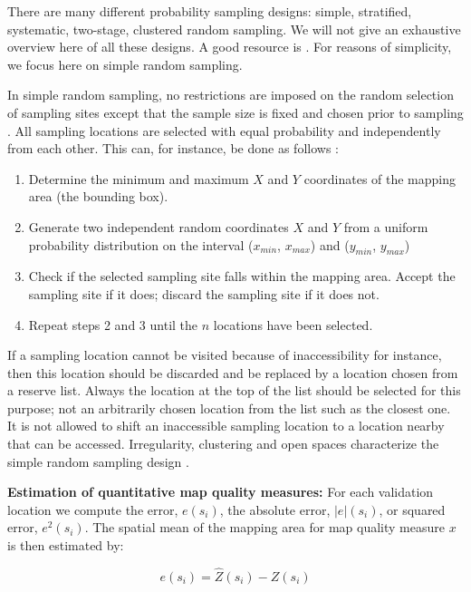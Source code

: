 \documentclass[10pt,b5paper,]{book}
\theoremstyle{definition}
\theoremstyle{definition}
\theoremstyle{definition}
\theoremstyle{remark}
\begin{document}
There are many different probability sampling designs: simple,
stratified, systematic, two-stage, clustered random sampling. We will
not give an exhaustive overview here of all these designs. A good
resource is \cite{de2006sampling}. For reasons of simplicity, we focus
here on simple random sampling.

In simple random sampling, no restrictions are imposed on the random
selection of sampling sites except that the sample size is fixed and
chosen prior to sampling \citep{de2006sampling}. All sampling locations
are selected with equal probability and independently from each other.
This can, for instance, be done as follows \citep{de2006sampling}:

\begin{enumerate}
\def\labelenumi{\arabic{enumi}.}
\item
  Determine the minimum and maximum \(X\) and \(Y\) coordinates of the
  mapping area (the bounding box).
\item
  Generate two independent random coordinates \(X\) and \(Y\) from a
  uniform probability distribution on the interval (\(x_{min}\),
  \(x_{max}\)) and (\(y_{min}\), \(y_{max}\))
\item
  Check if the selected sampling site falls within the mapping area.
  Accept the sampling site if it does; discard the sampling site if it
  does not.
\item
  Repeat steps 2 and 3 until the \(n\) locations have been selected.
\end{enumerate}

If a sampling location cannot be visited because of inaccessibility for
instance, then this location should be discarded and be replaced by a
location chosen from a reserve list. Always the location at the top of
the list should be selected for this purpose; not an arbitrarily chosen
location from the list such as the closest one. It is not allowed to
shift an inaccessible sampling location to a location nearby that can be
accessed. Irregularity, clustering and open spaces characterize the
simple random sampling design \citep{de2006sampling}.

\textbf{Estimation of quantitative map quality measures:} For each
validation location we compute the error, \(e(s_i)\), the absolute
error, \(|e|(s_i)\), or squared error, \(e^2(s_i)\). The spatial mean of
the mapping area for map quality measure \(x\) is then estimated by:

\begin{equation}
e(s_i) = \hat{Z}(s_i) - Z(s_i)
\end{equation}
\end{document}
